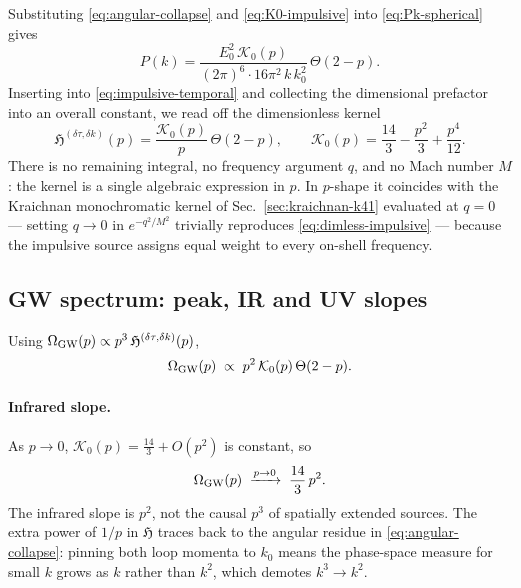 \documentclass[10pt,prd,aps,nobibnotes,superscriptaddress,preprintnumbers,notitlepage]{revtex4-1}
\begin{document}
Substituting \eqref{eq:angular-collapse} and \eqref{eq:K0-impulsive} into
\eqref{eq:Pk-spherical} gives
\begin{equation}
  P(k) = \frac{E_0^2\,\mathcal{K}_0(p)}{(2\pi)^6\cdot 16\pi^2\,k\,k_0^2}\,\Theta(2-p).
  \label{eq:Pk-result}
\end{equation}
Inserting into \eqref{eq:impulsive-temporal} and collecting the dimensional
prefactor into an overall constant, we read off the dimensionless kernel
\begin{equation}
  \boxed{
  \mathfrak{H}^{(\delta\tau,\delta k)}(p) = \frac{\mathcal{K}_0(p)}{p}\,\Theta(2-p),
  \qquad
  \mathcal{K}_0(p)=\frac{14}{3}-\frac{p^2}{3}+\frac{p^4}{12}.
  }
  \label{eq:dimless-impulsive}
\end{equation}
There is no remaining integral, no frequency argument $q$, and no Mach number
$M$: the kernel is a single algebraic expression in $p$. In $p$-shape it
coincides with the Kraichnan monochromatic kernel of
Sec.~\ref{sec:kraichnan-k41} evaluated at $q=0$ — setting $q\to0$ in
$e^{-q^2/M^2}$ trivially reproduces \eqref{eq:dimless-impulsive} — because the
impulsive source assigns equal weight to every on-shell frequency.

\subsection{GW spectrum: peak, IR and UV slopes}
\label{sec:impulsive-result}

Using $\Omega_{\rm GW}(p)\propto p^3\,\mathfrak{H}^{(\delta\tau,\delta k)}(p)$,
\begin{equation}
  \Omega_{\rm GW}(p) \;\propto\; p^2\,\mathcal{K}_0(p)\,\Theta(2-p).
  \label{eq:omega-impulsive}
\end{equation}

\paragraph{Infrared slope.}
As $p\to0$, $\mathcal{K}_0(p)=\tfrac{14}{3}+O(p^2)$ is constant, so
\begin{equation}
  \Omega_{\rm GW}(p) \;\xrightarrow{p\to0}\; \frac{14}{3}\,p^2.
\end{equation}
The infrared slope is $p^2$, not the causal $p^3$ of spatially extended
sources. The extra power of $1/p$ in $\mathfrak{H}$ traces back to the angular
residue in \eqref{eq:angular-collapse}: pinning both loop momenta to $k_0$ means
the phase-space measure for small $k$ grows as $k$ rather than $k^2$, which
demotes $k^3\to k^2$.
\end{document}
